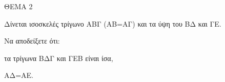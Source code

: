 
ΘΕΜΑ 2

Δίνεται ισοσκελές τρίγωνο ΑΒΓ (ΑΒ=ΑΓ) και τα ύψη του ΒΔ και ΓΕ.

Να αποδείξετε ότι:

\begin{alist}
\item τα τρίγωνα ΒΔΓ και ΓΕΒ είναι ίσα, 

\item ΑΔ=ΑΕ. 
\end{alist}
